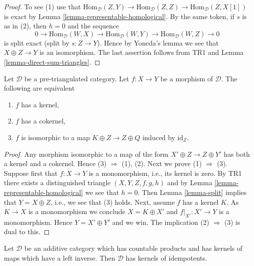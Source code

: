 \begin{proof}
To see (1) use that
$\text{Hom}_{\mathcal{D}}(Z, Y) \to \text{Hom}_{\mathcal{D}}(Z, Z) \to
\text{Hom}_{\mathcal{D}}(Z, X[1])$
is exact by
Lemma \ref{lemma-representable-homological}.
By the same token, if $s$ is as in (2), then $h = 0$ and the sequence
$$
0 \to \text{Hom}_{\mathcal{D}}(W, X) \to \text{Hom}_{\mathcal{D}}(W, Y)
\to \text{Hom}_{\mathcal{D}}(W, Z) \to 0
$$
is split exact (split by $s : Z \to Y$). Hence by Yoneda's lemma we
see that $X \oplus Z \to Y$ is an isomorphism. The last assertion follows
from TR1 and
Lemma \ref{lemma-direct-sum-triangles}.
\end{proof}

\begin{lemma}
\label{lemma-when-split}
Let $\mathcal{D}$ be a pre-triangulated category.
Let $f : X \to Y$ be a morphism of $\mathcal{D}$.
The following are equivalent
\begin{enumerate}
\item $f$ has a kernel,
\item $f$ has a cokernel,
\item $f$ is isomorphic to a map $K \oplus Z \to Z \oplus Q$
induced by $\text{id}_Z$.
\end{enumerate}
\end{lemma}

\begin{proof}
Any morphism isomorphic to a map of the form
$X' \oplus Z \to Z \oplus Y'$ has both a kernel and a cokernel.
Hence (3) $\Rightarrow$ (1), (2).
Next we prove (1) $\Rightarrow$ (3).
Suppose first that $f : X \to Y$ is a monomorphism, i.e., its kernel is zero.
By TR1 there exists a distinguished triangle $(X, Y, Z, f, g, h)$
and by
Lemma \ref{lemma-representable-homological}
we see that $h = 0$. Then
Lemma \ref{lemma-split}
implies that $Y = X \oplus Z$, i.e., we see that (3) holds.
Next, assume $f$ has a kernel $K$. As $K \to X$ is a monomorphism we
conclude $X = K \oplus X'$ and $f|_{X'} : X' \to Y$ is a monomorphism.
Hence $Y = X' \oplus Y'$ and we win.
The implication (2) $\Rightarrow$ (3) is dual to this.
\end{proof}

\begin{lemma}
\label{lemma-projectors-have-images}
Let $\mathcal{D}$ be an additive category which has countable products
and has kernels of maps which have a left inverse. Then $\mathcal{D}$
has kernels of idempotents.
\end{lemma}

